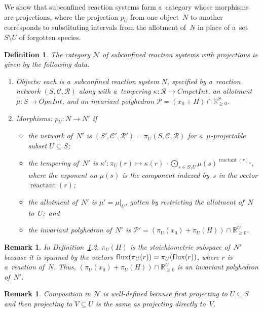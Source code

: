 \documentclass[pdftex]{sigma}
\newtheorem{Definition}[Theorem]{Definition}
\newtheorem{Remark}[Theorem]{Remark}
\newcommand{\source}[1]{\operatorname{reactant}(#1)}
\newcommand{\flux}[1]{\operatorname{f\/lux}(#1)} %
\begin{document}
We show that subconf\/ined reaction systems form a~category whose morphisms are projections, where the projection $p_U$
from one object~$N$ to another corresponds to substituting intervals from the allotment of~$N$ in place of a~set
$S\setminus U$ of forgotten species.
\begin{Definition}
\label{def:intWtd}
The category $\mathcal N$ of subconf\/ined reaction systems with projections is given by the following
data.
\begin{enumerate}\itemsep=0pt
\item Objects: each is a~subconf\/ined reaction system $N$, specif\/ied by a~reaction network $(S,\mathcal C,\mathcal
R)$ along with a~tempering $\kappa:\mathcal R\rightarrow\mathit{CmpctInt}$, an allotment $\mu:S\to\mathit{OpnInt}$, and
an invariant polyhedron  $\mathcal P=(x_0+H)\cap\mathbb{R}_{\geq 0}^{S}$.
 \item Morphisms: $p_U:N\to N'$
if
\begin{itemize}\itemsep=0pt
\item the network of~$N'$ is $(S',\mathcal C',\mathcal R')=\pi_U(S,\mathcal C,\mathcal R)$ for a~$\mu$-projectable
subset $U\subseteq S$; \item the tempering of~$N'$ is
$\displaystyle\kappa':\pi_U(r)\mapsto\kappa(r)\,\cdot\!\bigodot_{s\in S\setminus U}\mu(s)^{\source{r}_s}$, where the
exponent on $\mu(s)$ is the component indexed by~$s$ in the vector $\source r$; \item the allotment of~$N'$ is
$\mu'=\mu|_U$, gotten by restricting the allotment of~$N$ to~$U$;~and \item the invariant polyhedron  of~$N'$ is
$\mathcal P'=\left(\pi_U(x_0)+\pi_U(H)\right)\cap\mathbb{R}_{\geq 0}^{U}$.
\end{itemize}
\end{enumerate}
\end{Definition}
\begin{Remark}
\label{r:projected_scc}
In Def\/inition~\ref{def:intWtd}.2, $\pi_U(H)$ is the stoichiometric subspace of~$N'$ because it is spanned by the
vectors $\flux{\pi_U(r)}=\pi_U(\flux{r})$, where $r$ is a~reaction of~$N$.
Thus, $\left(\pi_U(x_0)+\pi_U(H)\right)\cap\mathbb{R}_{\geq 0}^{U}$ is an invariant polyhedron  of~$N'$.
\end{Remark}
\begin{Remark}
\label{r:composition}
Composition in $\mathcal N$ is well-def\/ined because f\/irst projecting to $U\subseteq S$ and then projecting to
$V\subseteq U$ is the same as projecting directly to~$V$.
\end{Remark}
\end{document}
